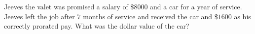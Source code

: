 Jeeves the valet was promised a salary of $\$8000$ and a car for a year of service. Jeeves left the job after $7$ months of service and received the car and $\$1600$ as his correctly prorated pay. What was the dollar value of the car?
